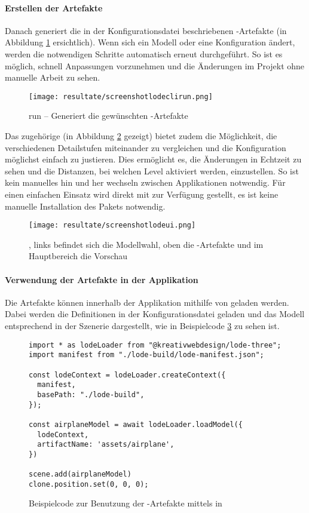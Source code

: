 \paragraph{Erstellen der Artefakte}
Danach generiert  die in der Konfigurationsdatei beschriebenen -Artefakte (in Abbildung \ref{fig:lodeclirun} ersichtlich). Wenn sich ein Modell oder eine Konfiguration ändert, werden die notwendigen Schritte automatisch erneut durchgeführt. So ist es möglich, schnell Anpassungen vorzunehmen und die Änderungen im Projekt ohne manuelle Arbeit zu sehen.

\begin{figure}[H]
  \centering
  \texttt{[image: resultate/screenshotlodeclirun.png]}
  \caption{ run – Generiert die gewünschten -Artefakte}
  \label{fig:lodeclirun}
\end{figure}

Das zugehörige  (in Abbildung \ref{fig:lodeui} gezeigt) bietet zudem die Möglichkeit, die verschiedenen Detailstufen miteinander zu vergleichen und die Konfiguration möglichst einfach zu justieren. Dies ermöglicht es, die Änderungen in Echtzeit zu sehen und die Distanzen, bei welchen Level aktiviert werden, einzustellen. So ist kein manuelles hin und her wechseln zwischen Applikationen notwendig.
Für einen einfachen Einsatz wird  direkt mit  zur Verfügung gestellt, es ist keine manuelle Installation des Pakets notwendig.

\begin{figure}[H]
  \centering
  \texttt{[image: resultate/screenshotlodeui.png]}
  \caption{, links befindet sich die Modellwahl, oben die -Artefakte und im Hauptbereich die Vorschau}
  \label{fig:lodeui}
\end{figure}

\paragraph{Verwendung der Artefakte in der Applikation}
Die Artefakte können innerhalb der Applikation mithilfe von  geladen werden. Dabei werden die Definitionen in der Konfigurationsdatei geladen und das Modell entsprechend in der Szenerie dargestellt, wie in Beispielcode \ref{code:lodeThreeUsage} zu sehen ist.

\begin{figure}[H]
  \begin{lstlisting}[style=JavaScript]
import * as lodeLoader from "@kreativwebdesign/lode-three";
import manifest from "./lode-build/lode-manifest.json";

const lodeContext = lodeLoader.createContext({
  manifest,
  basePath: "./lode-build",
});

const airplaneModel = await lodeLoader.loadModel({
  lodeContext,
  artifactName: 'assets/airplane',
})

scene.add(airplaneModel)
clone.position.set(0, 0, 0);
  \end{lstlisting}
  \caption{Beispielcode zur Benutzung der -Artefakte mittels  in }
  \label{code:lodeThreeUsage}
\end{figure}

